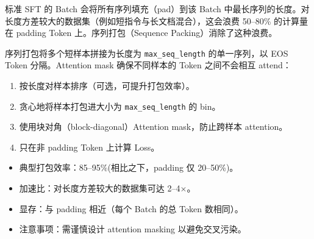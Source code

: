 \begin{intuitionbox}[Padding 问题]
标准 SFT 的 Batch 会将所有序列填充（pad）到该 Batch 中最长序列的长度。对长度方差较大的数据集（例如短指令与长文档混合），这会浪费 50--80\% 的计算量在 padding Token 上。序列打包（Sequence Packing）消除了这种浪费。
\end{intuitionbox}

序列打包将多个短样本拼接为长度为 \texttt{max\_seq\_length} 的单一序列，以 EOS Token 分隔。Attention mask 确保不同样本的 Token 之间不会相互 attend：

\begin{enumerate}
  \item 按长度对样本排序（可选，可提升打包效率）。
  \item 贪心地将样本打包进大小为 \texttt{max\_seq\_length} 的 bin。
  \item 使用块对角（block-diagonal）Attention mask，防止跨样本 attention。
  \item 只在非 padding Token 上计算 Loss。
\end{enumerate}

\begin{keybox}[打包效率]
\begin{itemize}
  \item 典型打包效率：85--95\%(相比之下，padding 仅 20--50\%)。
  \item 加速比：对长度方差较大的数据集可达 2--4$\times$。
  \item 显存：与 padding 相近（每个 Batch 的总 Token 数相同）。
  \item 注意事项：需谨慎设计 attention masking 以避免交叉污染。
\end{itemize}
\end{keybox}


